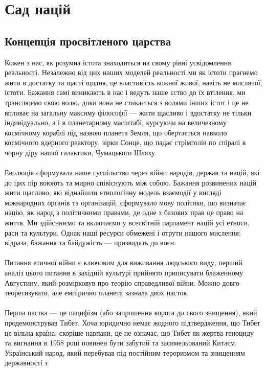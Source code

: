 \section{Сад націй}

\subsection{Концепція просвітленого царства}

Кожен з нас, як розумна істота знаходиться на свому рівні усвідомлення реальності.
Незалежно від цих наших моделей реальності ми як істоти прагнемо жити в
достатку та щасті щодня, це властивість кожної живої, навіть не мислячої, істоти.
Бажання самі виникають в нас і ведуть наше єство до їх втілення, ми транслюємо
свою волю, доки вона не стикається з волями інших істот і це не впливає на
загальну максиму філософії --- жити щасливо і вдостатку не тільки індивідуально,
а і в планетарному масштабі, курсуючи на величезному космічному кораблі під назвою
планета Земля, що обертається навколо космічного ядерного реактору, зірки Сонце,
що падає стрімголів по спіралі в чорну діру нашої галактики, Чумацького Шляху.
\\
\\
Еволюція сформувала наше суспільство через війни народів, держав та націй, які
до цих пір воюють та мирно співіснують між собою. Бажання розвинених націй жити
щасливо, які віднайшли етнологічну модель взаємодії у вигляді міжнародних органів
та організацій, сформувало мову політики, що визначає націю, як народ з політичними
правами, де одне з базових прав це право на життя. Ми здійснюємо та включаємо у
всесвітній парламент націй усі етноси, раси та культури. Однак наші ресурси обмежені
і отрути нашого мислення: відраза, бажання та байдужість --- призводять до воєн.
\\
\\
Питання етичної війни є ключовим для виживання людського виду, перший аналіз
цього питання в західній культурі прийнято приписувати блаженному Августину,
який розмірковув про теорію справедливої війни. Можно довго теоретизувати,
але емпірично планета зазнала двох пасток.
\\
\\
Перша пастка --- це пацифізм (або запрошення ворога до свого знищення),
який продемонстрував Тибет. Хоча юридично немає жодного підтвердження,
що Тибет це вільна країна, скоріше навпаки, це не означає, що Тибет як
жертва геноциду та вигнання в 1958 році повинен бути забутий та засимельований Китаєм.
Український народ, який перебував під постійним тероризмом та знищенням державності з
